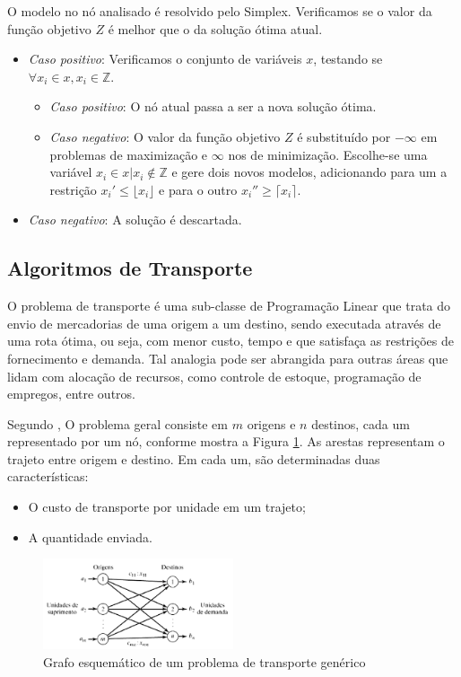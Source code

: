\documentclass [11pt]{articleSBPO}
\begin{document}
\bigskip

\noindent O modelo no nó analisado é resolvido pelo Simplex. Verificamos se o valor da função objetivo $Z$ é melhor que o da solução ótima atual.
\begin{itemize}
	\item \textit{Caso positivo}: Verificamos o conjunto de variáveis $x$, testando se $\forall  x_{i} \in x, x_{i} \in \mathbb{Z}$.
	\begin{itemize}
		\item \textit{Caso positivo}: O nó atual passa a ser a nova solução ótima.
		\item \textit{Caso negativo}: O valor da função objetivo $Z$ é substituído por $-\infty$ em problemas de maximização e $\infty$ nos de minimização. Escolhe-se uma variável $x_{i} \in x | x_{i} \notin \mathbb{Z}$ e gere dois novos modelos, adicionando para um a restrição $x_{i}' \leq \lfloor x_{i} \rfloor$ e para o outro $x_{i}'' \geq \lceil x_{i} \rceil$.
	\end{itemize}
	\item \textit{Caso negativo}: A solução é descartada. 
\end{itemize}

\subsection{Algoritmos de Transporte}\label{subsec:transporte}

O problema de transporte é uma sub-classe de Programação Linear que trata do envio de mercadorias de uma origem a um destino, sendo executada através de uma rota ótima, ou seja, com menor custo, tempo e que satisfaça as restrições de fornecimento e demanda. Tal analogia pode ser abrangida para outras áreas que lidam com alocação de recursos, como controle de estoque, programação de empregos, entre outros.

Segundo \cite{TAHA}, O problema geral consiste em $m$ origens e $n$ destinos, cada um representado por um nó, conforme mostra a Figura \ref{fig:grafotransporte}. As arestas representam o trajeto entre origem e destino. Em cada um, são determinadas duas características:

\begin{itemize}
	\item O custo de transporte por unidade em um trajeto;
	\item A quantidade enviada.
\end{itemize}

\begin{figure}[!h]
	\centering
	\includegraphics[width=0.5\textwidth]{img/grafotransporte.png}
	\caption[]{Grafo esquemático de um problema de transporte genérico}
	\label{fig:grafotransporte}
\end{figure}
\end{document}
